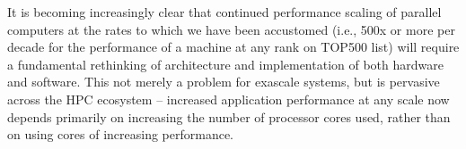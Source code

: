{\Large\textbf{\TheTitle}\par}

It is becoming increasingly clear that continued performance scaling of 
parallel computers at the rates to which we have been accustomed (i.e., 500x or more
per decade for the performance of a machine at any rank on TOP500 list) will
require a fundamental rethinking of architecture and implementation of 
both hardware and software.   This not merely a problem for exascale systems,
but is pervasive across the HPC ecosystem -- increased application performance at
any scale now depends primarily on increasing the number of processor cores used,
rather than on using cores of increasing performance.







